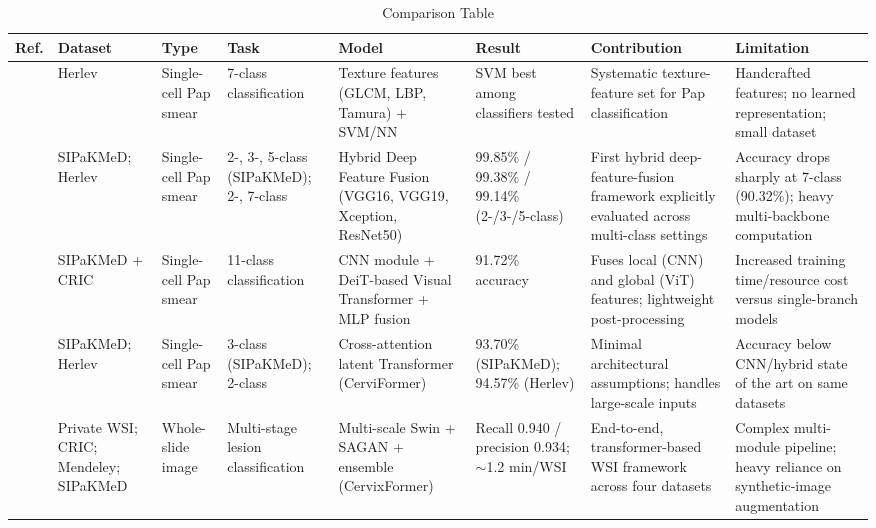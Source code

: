 \documentclass[pdflatex,sn-nature]{sn-jnl}%
\theoremstyle{thmstyleone}%
\theoremstyle{thmstyletwo}%
\theoremstyle{thmstylethree}%
\begin{document}
\begin{table}[htbp]
\centering
\caption{Comparison Table}
\label{tab:ablation_study_portrait}
\vspace{0.5em}
\footnotesize
\setlength{\tabcolsep}{3pt} %

\begin{tabularx}{\textwidth}{c p{1.5cm} p{1.3cm} p{1.5cm} p{1.4cm} p{1.5cm} p{1.8cm} p{1.8cm}}
\toprule
\textbf{Ref.} & \textbf{Dataset} & \textbf{Type} & \textbf{Task} & \textbf{Model} & \textbf{Result} & \textbf{Contribution} & \textbf{Limitation} \\
\midrule

\cite{Lite37} & Herlev & Single-cell Pap smear & 7-class classification & Texture features (GLCM, LBP, Tamura) + SVM/NN & SVM best among classifiers tested & Systematic texture-feature set for Pap classification & Handcrafted features; no learned representation; small dataset \\

\cite{Lite39} & SIPaKMeD; Herlev & Single-cell Pap smear & 2-, 3-, 5-class (SIPaKMeD); 2-, 7-class & Hybrid Deep Feature Fusion (VGG16, VGG19, Xception, ResNet50) & 99.85\% / 99.38\% / 99.14\% (2-/3-/5-class) & First hybrid deep-feature-fusion framework explicitly evaluated across multi-class settings & Accuracy drops sharply at 7-class (90.32\%); heavy multi-backbone computation \\

\cite{Lite36} & SIPaKMeD + CRIC & Single-cell Pap smear & 11-class classification & CNN module + DeiT-based Visual Transformer + MLP fusion & 91.72\% accuracy & Fuses local (CNN) and global (ViT) features; lightweight post-processing & Increased training time/resource cost versus single-branch models \\

\cite{Lite41} & SIPaKMeD; Herlev & Single-cell Pap smear & 3-class (SIPaKMeD); 2-class & Cross-attention latent Transformer (CerviFormer) & 93.70\% (SIPaKMeD); 94.57\% (Herlev) & Minimal architectural assumptions; handles large-scale inputs & Accuracy below CNN/hybrid state of the art on same datasets \\

\cite{Lite42} & Private WSI; CRIC; Mendeley; SIPaKMeD & Whole-slide image & Multi-stage lesion classification & Multi-scale Swin + SAGAN + ensemble (CervixFormer) & Recall 0.940 / precision 0.934; $\sim$1.2 min/WSI & End-to-end, transformer-based WSI framework across four datasets & Complex multi-module pipeline; heavy reliance on synthetic-image augmentation \\


\end{tabularx}
\end{table}
\end{document}

